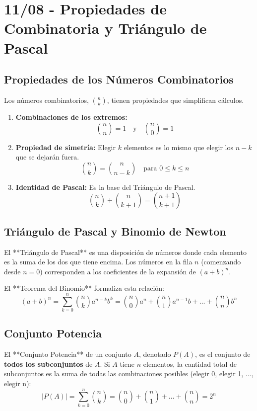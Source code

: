\documentclass[12pt, letterpaper]{article}
\begin{document}
\section{11/08 - Propiedades de Combinatoria y Triángulo de Pascal}
\subsection{Propiedades de los Números Combinatorios}
Los números combinatorios, $\binom{n}{k}$, tienen propiedades que simplifican cálculos.
\begin{enumerate}
	\item \textbf{Combinaciones de los extremos:} 
	      \[ \binom{n}{n} = 1 \quad \text{y} \quad \binom{n}{0} = 1 \]

	\item \textbf{Propiedad de simetría:} Elegir $k$ elementos es lo mismo que elegir los $n-k$ que se dejarán fuera.
	      \[ \binom{n}{k} = \binom{n}{n-k} \quad \text{para } 0 \le k \le n \]

	\item \textbf{Identidad de Pascal:} Es la base del Triángulo de Pascal.
	      \[ \binom{n}{k} + \binom{n}{k+1} = \binom{n+1}{k+1} \]
\end{enumerate}

\subsection{Triángulo de Pascal y Binomio de Newton}
El **Triángulo de Pascal** es una disposición de números donde cada elemento es la suma de los dos que tiene encima. Los números en la fila $n$ (comenzando desde $n=0$) corresponden a los coeficientes de la expansión de $(a+b)^n$.

El **Teorema del Binomio** formaliza esta relación:
\[ (a+b)^n = \sum_{k=0}^{n} \binom{n}{k} a^{n-k} b^k = \binom{n}{0}a^n + \binom{n}{1}a^{n-1}b + \dots + \binom{n}{n}b^n \]

\subsection{Conjunto Potencia}
El **Conjunto Potencia** de un conjunto $A$, denotado $P(A)$, es el conjunto de \textbf{todos los subconjuntos} de $A$. Si $A$ tiene $n$ elementos, la cantidad total de subconjuntos es la suma de todas las combinaciones posibles (elegir 0, elegir 1, ..., elegir n):
\[ |P(A)| = \sum_{k=0}^{n} \binom{n}{k} = \binom{n}{0} + \binom{n}{1} + \dots + \binom{n}{n} = 2^n \]
\end{document}
